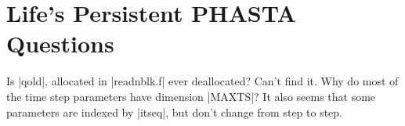 \documentclass[11pt]{article}
\begin{document}
\section{Life's Persistent PHASTA Questions}
\begin{outline}[deep]
	\1 Is |qold|, allocated in |readnblk.f| ever deallocated? Can't find it.
	\1 Why do most of the time step parameters have dimension |MAXTS|?
		\2 It also seems that some parameters are indexed by |itseq|, but don't change from step to step.
\end{outline}

\label{lastpage}
\end{document}
